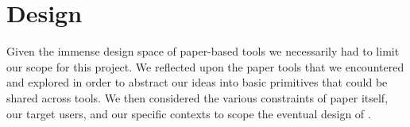 \documentclass{sig-alternate}
\begin{document}


\section{Design}

Given the immense design space of paper-based tools we necessarily had to limit our scope for this project. We reflected upon the paper tools that we encountered and explored in order to abstract our ideas into basic primitives that could be shared across tools. We then considered the various constraints of paper itself, our target users, and our specific contexts to scope the eventual design of \nifty.


\end{document}
